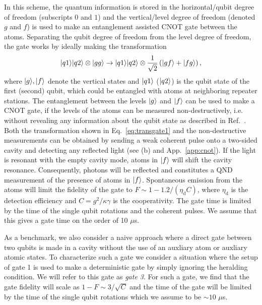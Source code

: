 In this scheme, the quantum information is stored in the horizontal/qubit degree
of freedom (subscripts $0$ and $1$) and the vertical/level degree of freedom
(denoted $g$ and $f$) is used to make an entanglement assisted CNOT gate between
the atoms. Separating the qubit degree of freedom from the level degree of
freedom, the gate works by ideally making the transformation
\begin{equation} \label{eq:transgate1}
| q1 \rangle| q2 \rangle\otimes| gg \rangle\to
| q1 \rangle| q2 \rangle\otimes\frac{1}{\sqrt{2}}\left(| gf \rangle+| fg \rangle\right),
\end{equation} 
where $| g \rangle,| f \rangle$ denote the vertical states and $| q1 \rangle$ ($| q2 \rangle$)
is the qubit state of the first (second) qubit, which could be entangled with
atoms at neighboring repeater stations. The entanglement between the levels
$| g \rangle$ and $| f \rangle$ can be used to make a CNOT gate, if the levels of the
atoms can be measured non-destructively, i.e. without revealing any information
about the qubit state as described in Ref.~\cite{Anders2prl}. Both the
transformation shown in Eq.~\eqref{eq:transgate1} and the non-destructive
measurements can be obtained by sending a weak coherent pulse onto a two-sided
cavity and detecting any reflected light (see (b) and
App.~\ref{app:cnot}). If the light is resonant with the empty cavity mode, atoms
in $| f \rangle$ will shift the cavity resonance. Consequently, photons will be
reflected and constitutes a QND measurement of the presence of atoms in
$| f \rangle$. Spontaneous emission from the atoms will limit the fidelity of the
gate to $F\sim1-1.2/(\eta_{\text{d}}C)$, where $\eta_{\text{d}}$ is the
detection efficiency and $C=g^{2}/\kappa\gamma$ is the cooperativity. The gate
time is limited by the time of the single qubit rotations and the coherent
pulses.  We assume that this gives a gate time on the order of 10 $\mu$s.

As a benchmark, we also consider a naive approach where a direct gate between
two qubits is made in a cavity without the use of an auxliary atom or auxliary
atomic states. To characterize such a gate we consider a situation where the
setup of gate 1 is used to make a deterministic gate by simply ignoring the
heralding condition. We will refer to this gate as \emph{gate 3}. For such a
gate, we find that the gate fidelity will scale as $1-F\sim3/\sqrt{C}$ and the
time of the gate will be limited by the time of the single qubit rotations which
we assume to be $\sim10$ $\mu$s.

